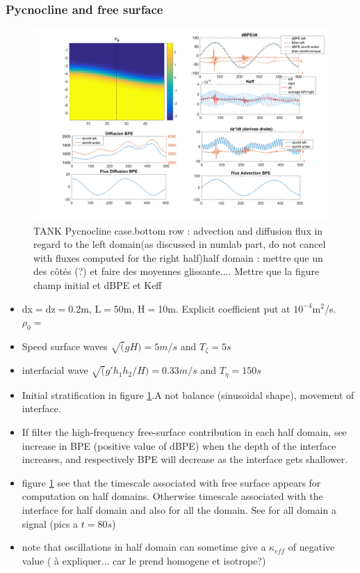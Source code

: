 \subsubsection{Pycnocline and free surface}

\begin{figure}[h!]
\centering
\includegraphics[width=1\textwidth]{./CHAP_BPE/AGBPE_numlab7.png}
\caption{TANK Pycnocline case.bottom row : advection and diffusion flux in regard to the left domain(as discussed in numlab part, do not cancel with fluxes computed for the right half)\color{red}half domain : mettre que un des côtés (?) et faire des moyennes glissante.... Mettre que la figure champ initial et dBPE et Keff\color{black}}
\label{figCpsin}
\end{figure}

\begin{itemize}
\item dx$=$dz$=$0.2m, L$=$50m, H$=$10m. Explicit coefficient put at $10^{-4}$m$^2$/s. \color{red}$\rho_0=$\color{black}
\item Speed surface waves $\sqrt(gH)=5m/s$ and $T_{\zeta}=5s$
\item interfacial wave $\sqrt(g'h_1h_2/H)=0.33m/s$ and $T_{\eta}=150s$
\item Initial stratification in figure \ref{figCpsin}.A not balance (sinusoidal shape), movement of interface.
\item If filter the high-frequency free-surface contribution in each half domain, see increase in BPE (positive value of dBPE) when the depth of the interface increases, and respectively BPE will decrease as the interface gets shallower.
\item figure \ref{figCpsin} see that the timescale associated with free surface appears for computation on half domains. Otherwise timescale associated with the interface for half domain and also for all the domain. See for all domain a signal (pics a $t=80s$)
\item note that oscillations in half domain can sometime give a $\kappa_{eff}$ of negative value ( à expliquer... car le prend homogene et isotrope?)
\end{itemize}



